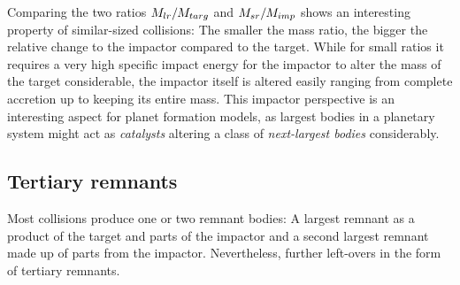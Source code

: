 
Comparing the two ratios $M_{lr} / M_{targ}$ and $M_{sr} / M_{imp}$ shows an interesting property of similar-sized collisions: The smaller the mass ratio, the bigger the relative change to the impactor compared to the target. While for small ratios it requires a very high specific impact energy for the impactor to alter the mass of the target considerable, the impactor itself is altered easily ranging from complete accretion up to keeping its entire mass. This impactor perspective is an interesting aspect for planet formation models, as largest bodies in a planetary system might act as \emph{catalysts} altering a class of \emph{next-largest bodies} \cite{Asphaug:2010p3539} considerably.

\subsection{Tertiary remnants}
Most collisions produce one or two remnant bodies: A largest remnant as a product of the target and parts of the impactor and a second largest remnant made up of parts from the impactor. Nevertheless, further left-overs in the form of tertiary remnants. 

